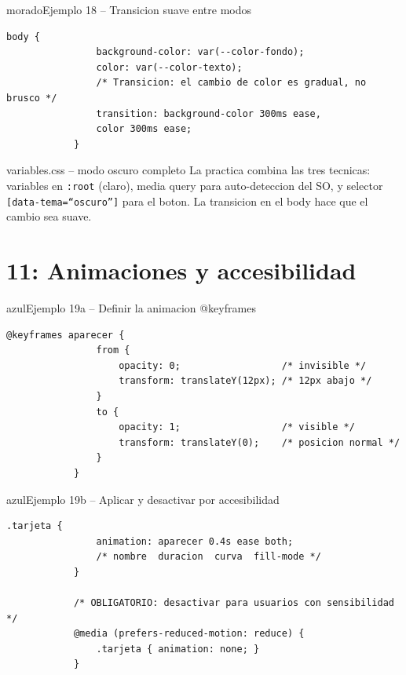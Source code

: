 \documentclass[11pt,a4paper]{article}
\begin{document}
	\begin{cajacodigo}{morado}{Ejemplo 18 -- Transicion suave entre modos}
		\begin{lstlisting}[style=codecss]
			body {
				background-color: var(--color-fondo);
				color: var(--color-texto);
				/* Transicion: el cambio de color es gradual, no brusco */
				transition: background-color 300ms ease,
				color 300ms ease;
			}
		\end{lstlisting}
	\end{cajacodigo}
	
	\begin{cajapractica}{variables.css -- modo oscuro completo}
		La practica combina las tres tecnicas: variables en \texttt{:root} (claro), media query para auto-deteccion del SO, y selector \texttt{[data-tema=``oscuro'']} para el boton. La transicion en el body hace que el cambio sea suave.
	\end{cajapractica}
	
	\section{11: Animaciones y accesibilidad}
	
	\begin{cajacodigo}{azul}{Ejemplo 19a -- Definir la animacion @keyframes}
		\begin{lstlisting}[style=codecss]
			@keyframes aparecer {
				from {
					opacity: 0;                  /* invisible */
					transform: translateY(12px); /* 12px abajo */
				}
				to {
					opacity: 1;                  /* visible */
					transform: translateY(0);    /* posicion normal */
				}
			}
		\end{lstlisting}
	\end{cajacodigo}
	
	\begin{cajacodigo}{azul}{Ejemplo 19b -- Aplicar y desactivar por accesibilidad}
		\begin{lstlisting}[style=codecss]
			.tarjeta {
				animation: aparecer 0.4s ease both;
				/* nombre  duracion  curva  fill-mode */
			}
			
			/* OBLIGATORIO: desactivar para usuarios con sensibilidad */
			@media (prefers-reduced-motion: reduce) {
				.tarjeta { animation: none; }
			}
		\end{lstlisting}
	\end{cajacodigo}
	
\end{document}
